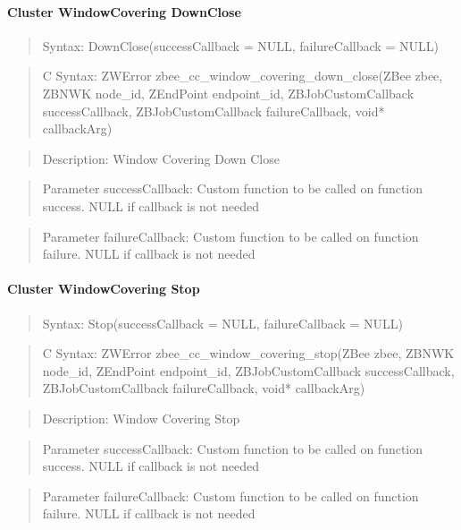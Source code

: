 \paragraph{Cluster WindowCovering DownClose}
\begin{quote}Syntax: DownClose(successCallback = NULL, failureCallback = NULL)\end{quote}
\begin{quote}C Syntax: ZWError zbee\_cc\_window\_covering\_down\_close(ZBee zbee, ZBNWK node\_id, ZEndPoint endpoint\_id, ZBJobCustomCallback successCallback, ZBJobCustomCallback failureCallback, void* callbackArg)\end{quote}
\begin{quote}Description: Window Covering Down Close\end{quote}
\begin{quote}Parameter successCallback: Custom function to be called on function success. NULL if callback is not needed\end{quote}
\begin{quote}Parameter failureCallback: Custom function to be called on function failure. NULL if callback is not needed\end{quote}


\paragraph{Cluster WindowCovering Stop}
\begin{quote}Syntax: Stop(successCallback = NULL, failureCallback = NULL)\end{quote}
\begin{quote}C Syntax: ZWError zbee\_cc\_window\_covering\_stop(ZBee zbee, ZBNWK node\_id, ZEndPoint endpoint\_id, ZBJobCustomCallback successCallback, ZBJobCustomCallback failureCallback, void* callbackArg)\end{quote}
\begin{quote}Description: Window Covering Stop\end{quote}
\begin{quote}Parameter successCallback: Custom function to be called on function success. NULL if callback is not needed\end{quote}
\begin{quote}Parameter failureCallback: Custom function to be called on function failure. NULL if callback is not needed\end{quote}


